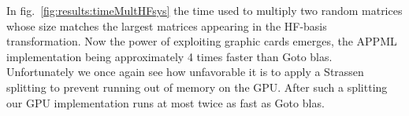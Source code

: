 In fig.~\ref{fig:results:timeMultHFsys} the time used to multiply two random matrices whose size matches the largest matrices appearing in the HF-basis transformation.
Now the power of exploiting graphic cards emerges, the APPML implementation being approximately 4 times faster than Goto blas.
Unfortunately we once again see how unfavorable it is to apply a Strassen splitting to prevent running out of memory on the GPU.
After such a splitting our GPU implementation runs at most twice as fast as Goto blas.
\begin{figure}
\begin{center}
\subfigure[$N=30$]{
}
\end{center}
\end{figure}
